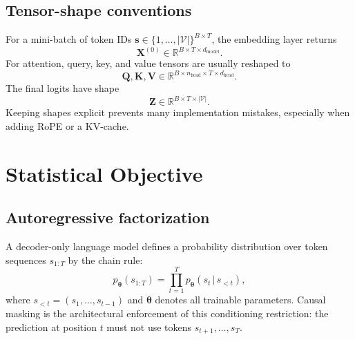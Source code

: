 \documentclass[11pt,a4paper]{article}
\theoremstyle{definition}
\theoremstyle{plain}
\newcommand{\vtheta}{\bm{\theta}}
\newcommand{\mQ}{\bm{Q}}
\newcommand{\mK}{\bm{K}}
\newcommand{\mV}{\bm{V}}
\newcommand{\mX}{\bm{X}}
\newcommand{\mZ}{\bm{Z}}
\newcommand{\reals}{\mathbb{R}}
\newcommand{\dmodel}{d_{\mathrm{model}}}
\newcommand{\dhead}{d_{\mathrm{head}}}
\newcommand{\nhead}{n_{\mathrm{head}}}
\newcommand{\vocab}{|\mathcal{V}|}
\newcommand{\given}{\,|\,}
\begin{document}
\subsection{Tensor-shape conventions}

For a mini-batch of token IDs $\bm{s}\in\{1,\ldots,\vocab\}^{B\times T}$, the embedding layer returns
\begin{equation}
    \mX^{(0)}\in\reals^{B\times T\times \dmodel}.
\end{equation}
For attention, query, key, and value tensors are usually reshaped to
\begin{equation}
    \mQ,\mK,\mV\in\reals^{B\times\nhead\times T\times\dhead}.
\end{equation}
The final logits have shape
\begin{equation}
    \mZ\in\reals^{B\times T\times\vocab}.
\end{equation}
Keeping shapes explicit prevents many implementation mistakes, especially when adding RoPE or a KV-cache.

\section{Statistical Objective}
\label{sec:statistical-objective}

\subsection{Autoregressive factorization}

A decoder-only language model defines a probability distribution over token sequences $s_{1:T}$ by the chain rule:
\begin{equation}\label{eq:chain_rule_lm}
    p_{\vtheta}(s_{1:T})=
    \prod_{t=1}^{T}p_{\vtheta}(s_t\given s_{<t}),
\end{equation}
where $s_{<t}=(s_1,\ldots,s_{t-1})$ and $\vtheta$ denotes all trainable parameters. Causal masking is the architectural enforcement of this conditioning restriction: the prediction at position $t$ must not use tokens $s_{t+1},\ldots,s_T$.
\end{document}
